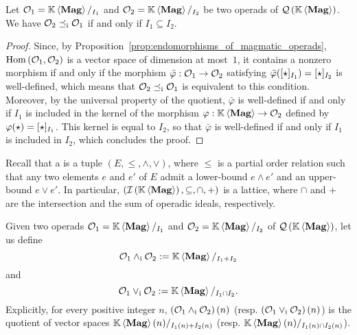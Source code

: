 \begin{Proposition} \label{prop:order_relations_on_QMag_and_ideals}
    Let $\mathcal{O}_1=\mathbb{K} \left\langle\mathbf{Mag}\right\rangle/_{I_1}$ and $\mathcal{O}_2=\mathbb{K} \left\langle\mathbf{Mag}\right\rangle/_{I_2}$ be two operads
    of $\mathcal{Q}\left(\mathbb{K} \left\langle\mathbf{Mag}\right\rangle\right)$. We have $\mathcal{O}_2\preceq_{\mathrm{i}}\mathcal{O}_1$ if and only if
    $I_1\subseteq I_2$.
\end{Proposition}
\begin{proof}
  Since, by Proposition~\ref{prop:endomorphisms_of_magmatic_operads},
  $\mathrm{Hom}\left(\mathcal{O}_1,\mathcal{O}_2\right)$ is a vector space of
  dimension at most~$1$, it contains a nonzero morphism if and only if
  the morphism $\bar{\varphi}:\mathcal{O}_1\to\mathcal{O}_2$ satisfying
  $\bar{\varphi}([\operatorname{\star}]_{I_1})=[\operatorname{\star}]_{I_2}$ is well-defined,
  which means that $\mathcal{O}_2\preceq_{\mathrm{i}}\mathcal{O}_1$ is equivalent to this
  condition. Moreover, by the universal property of the quotient,
  $\bar{\varphi}$ is well-defined if and only if $I_1$ is included
  in the kernel of the morphism $\varphi:\mathbb{K} \left\langle\mathbf{Mag}\right\rangle\to\mathcal{O}_2$ defined by
  $\varphi(\operatorname{\star})=[\operatorname{\star}]_{I_1}$. This kernel is equal to
  $I_2$, so that $\bar{\varphi}$ is well-defined if and only if
  $I_1$ is included in $I_2$, which concludes the proof.
\end{proof}
\medbreak

Recall that a  is a tuple
$\left(E,\leq,\wedge,\vee\right)$, where $\leq$ is a partial order
relation such that any two elements $e$ and $e'$ of $E$ admit a
lower-bound $e\wedge e'$ and an upper-bound $e\vee e'$. In particular,
$\left(\mathcal{I}\left(\mathbb{K} \left\langle\mathbf{Mag}\right\rangle\right),\subseteq,\cap,+\right)$ is a lattice, where $\cap$ and $+$
are the intersection and the sum of operadic ideals, respectively.
\medbreak

Given two operads $\mathcal{O}_1=\mathbb{K} \left\langle\mathbf{Mag}\right\rangle/_{I_1}$ and $\mathcal{O}_2=\mathbb{K} \left\langle\mathbf{Mag}\right\rangle/_{I_2}$ of
$\mathcal{Q}\left(\mathbb{K} \left\langle\mathbf{Mag}\right\rangle\right)$, let us define
\begin{equation} \label{equ:inf_QMag}
    \mathcal{O}_1\wedge_{\mathrm{i}} \mathcal{O}_2 := \mathbb{K} \left\langle\mathbf{Mag}\right\rangle/_{I_1+I_2}
\end{equation}
and
\begin{equation} \label{equ:sup_QMag}
    \mathcal{O}_1\vee_{\mathrm{i}} \mathcal{O}_2 := \mathbb{K} \left\langle\mathbf{Mag}\right\rangle/_{I_1\cap I_2}.
\end{equation}
Explicitly, for every positive integer $n$,
$\left(\mathcal{O}_1\wedge_{\mathrm{i}}\mathcal{O}_2\right)(n)$ (resp.
$\left(\mathcal{O}_1\vee_{\mathrm{i}}\mathcal{O}_2\right)(n)$) is the quotient of vector spaces
$\mathbb{K} \left\langle\mathbf{Mag}\right\rangle(n)/_{I_1(n)+I_2(n)}$ (resp.
$\mathbb{K} \left\langle\mathbf{Mag}\right\rangle(n)/_{I_1(n)\cap I_2(n)}$).
\medbreak


